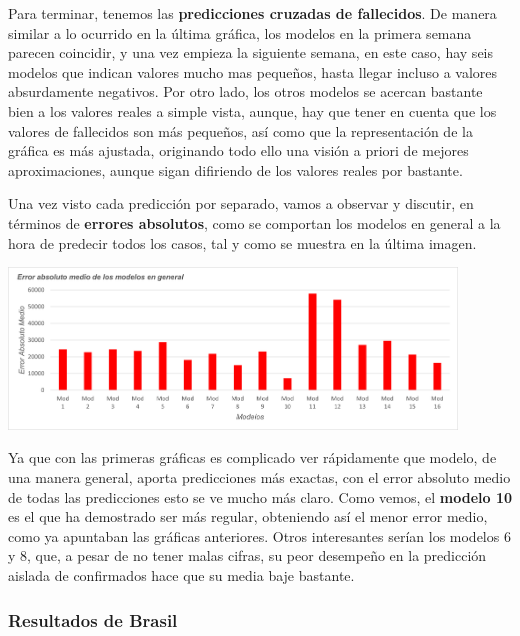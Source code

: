 \documentclass[12pt,a4paper, xcolor=table]{article}
\begin{document}
            Para terminar, tenemos las \textbf{predicciones cruzadas de fallecidos}. De manera similar a lo ocurrido en la última gráfica, los modelos en la primera semana parecen coincidir, y una vez empieza la siguiente semana, en este caso, hay seis modelos que indican valores mucho mas pequeños, hasta llegar incluso a valores absurdamente negativos. Por otro lado, los otros modelos se acercan bastante bien a los valores reales a simple vista, aunque, hay que tener en cuenta que los valores de fallecidos son más pequeños, así como que la representación de la gráfica es más ajustada, originando todo ello una visión a priori de mejores aproximaciones, aunque sigan difiriendo de los valores reales por bastante.
        
            \vspace{3mm}
            
            Una vez visto cada predicción por separado, vamos a observar y discutir, en términos de \textbf{errores absolutos}, como se comportan los modelos en general a la hora de predecir todos los casos, tal y como se muestra en la última imagen.
            
            \begin{center}
                \centering
                \includegraphics[width=450px]{img/eam_ES_parte2.png}
            \end{center}
            
            
            Ya que con las primeras gráficas es complicado ver rápidamente que modelo, de una manera general, aporta predicciones más exactas, con el error absoluto medio de todas las predicciones esto se ve mucho más claro.  Como vemos, el \textbf{modelo 10} es el que ha demostrado ser más regular, obteniendo así el menor error medio, como ya apuntaban las gráficas anteriores. Otros interesantes serían los modelos 6 y 8, que, a pesar de no tener malas cifras, su peor desempeño en la predicción aislada de confirmados hace que su media baje bastante.
            
            \subsubsection{Resultados de Brasil}
            
\end{document}
